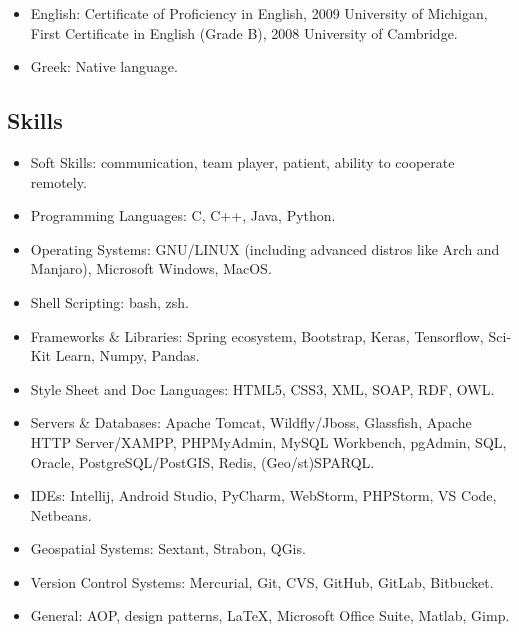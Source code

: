 \documentclass[a4paper,oneside,11pt]{article}
\begin{document}
\begin{itemize}

\item English: \textlatin{Certificate of Proficiency in English, 2009 University of Michigan, First Certificate in English (Grade B), 2008 University of Cambridge.}

\item Greek: Native language.

\end{itemize}

\subsection*{Skills}

\begin{itemize}

\item Soft Skills: communication, team player, patient, ability to cooperate remotely.

\item Programming Languages: \textlatin{C, C++, Java, Python}.

\item Operating Systems: \textlatin{GNU/LINUX (including advanced distros like Arch and Manjaro), Microsoft Windows, MacOS}.

\item Shell Scripting: \textlatin{bash, zsh}.

\item Frameworks \& Libraries: \textlatin{Spring ecosystem, Bootstrap, Keras, Tensorflow, SciKit Learn, Numpy, Pandas}.

\item Style Sheet and Doc Languages: \textlatin{HTML5, CSS3, XML, SOAP, RDF, OWL}.

\item Servers \& Databases: \textlatin{Apache Tomcat, Wildfly/Jboss, Glassfish, Apache HTTP Server/XAMPP, PHPMyAdmin, MySQL Workbench, pgAdmin, SQL, Oracle, PostgreSQL/PostGIS, Redis, (Geo/st)SPARQL}.

\item IDEs: \textlatin{Intellij, Android Studio, PyCharm, WebStorm, PHPStorm, VS Code, Netbeans}.

\item Geospatial Systems: \textlatin{Sextant, Strabon, QGis}.

\item Version Control Systems: \textlatin{Mercurial, Git, CVS, GitHub, GitLab, Bitbucket}.

\item General: \textlatin{AOP, design patterns, \LaTeX, Microsoft Office Suite, Matlab, Gimp}.

\end{itemize}
\end{document}
